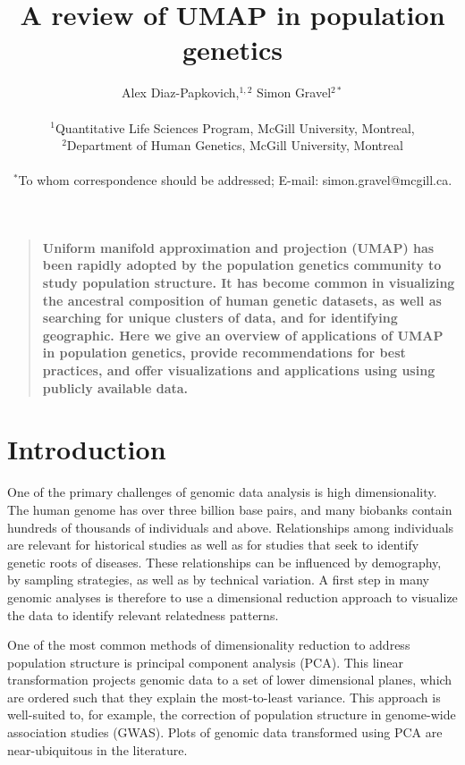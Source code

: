\documentclass[12pt]{article}
\title{A review of UMAP in population genetics}
\author
{Alex Diaz-Papkovich,$^{1,2}$ Simon Gravel$^{2\ast}$\\
\\
\normalsize{$^{1}$Quantitative Life Sciences Program, McGill University, Montreal,}\\
\normalsize{$^{2}$Department of Human Genetics, McGill University, Montreal}\\
\\
\normalsize{$^\ast$To whom correspondence should be addressed; E-mail:  simon.gravel@mcgill.ca.}
}
\date{}
\newenvironment{sciabstract}{%
\begin{quote} \bf}
{\end{quote}}
\begin{document}
 


\baselineskip24pt


\maketitle 



\begin{sciabstract}
Uniform manifold approximation and projection (UMAP) has been rapidly adopted by the population genetics community to study population structure. It has become common in visualizing the ancestral composition of human genetic datasets, as well as searching for unique clusters of data, and for identifying geographic. Here we give an overview of applications of UMAP in population genetics, provide recommendations for best practices, and offer visualizations and applications using using publicly available data.
\end{sciabstract}

\section*{Introduction}

One of the primary challenges of genomic data analysis is high dimensionality. The human genome has over three billion base pairs, and many biobanks contain hundreds of thousands of individuals and above. Relationships among individuals are relevant for historical studies as well as for studies that seek to identify genetic roots of diseases. These relationships can be influenced by demography, by sampling strategies, as well as by technical variation. A first step in many genomic analyses is therefore to use a dimensional reduction approach to visualize the data to identify relevant relatedness patterns. 



One of the most common methods of dimensionality reduction to address population structure is principal component analysis (PCA). This linear transformation projects genomic data to a set of lower dimensional planes, which are ordered such that they explain the most-to-least variance. This approach is well-suited to, for example, the correction of population structure in genome-wide association studies (GWAS).\cite{patterson2006population} Plots of genomic data transformed using PCA are near-ubiquitous in the literature.
\end{document}
